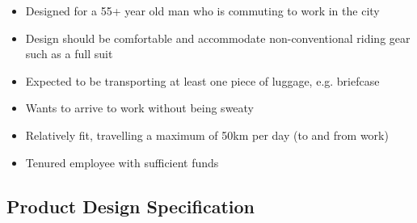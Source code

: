 \documentclass[a4paper,11pt]{article}
\begin{document}
\begin{itemize}
	\setlength{\itemsep}{0pt}
	\item Designed for a 55+ year old man who is commuting to work in the city
	\item Design should be comfortable and accommodate non-conventional riding gear such as a full suit
	\item Expected to be transporting at least one piece of luggage, e.g. briefcase
	\item Wants to arrive to work without being sweaty
	\item Relatively fit, travelling a maximum of 50km per day (to and from work)
	\item Tenured employee with sufficient funds
\end{itemize}

\subsection{Product Design Specification}
\end{document}
